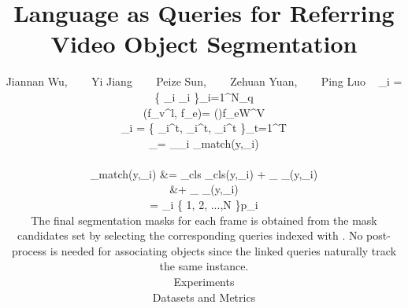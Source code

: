 \documentclass[10pt,twocolumn,letterpaper]{article}
\begin{document}
\title{Language as Queries for Referring Video Object Segmentation}

\author
{
Jiannan Wu, 
~~~
Yi Jiang
~~~
Peize Sun, 
~~~
Zehuan Yuan, 
~~~
Ping Luo
\
    \label{eq:dynamic_convolution}
    _{i} = \left \{ _{i} \circledast \omega_{i} \right \}_{i=1}^{N_{q}}

    \label{eq:interact}
    (f_{v}^{l}, f_{e})= ()f_{e}W^{V}

    \label{eq:hatyi}
    \vspace{-2mm}
    _{i} = \left \{ _{i}^{t}, _{i}^{t}, _{i}^{t} \right \}_{t=1}^{T}

    \label{eq:min}
    \vspace{-2mm}
    _{}= \mathop{\arg\min}_{_{i}\in {}} _{match}(y,_{i})
    \vspace{-2mm}

\label{eq:match}
\begin{aligned}
\vspace{-2mm}
    _{match}(y,_{i})  &=     
    \lambda_{cls}  _{cls}(y,\hat{y}_{i}) 
    + \lambda_{} _{\text{box}}(y,_{i}) \\
    &+ \lambda_{}  \mathcal{L}_{\text{mask}}(y,\hat{y}_{i}) 
    \vspace{-2mm}
\end{aligned}

    \label{eq:inference}
    \vspace{-2mm}
    \sigma = \mathop{\arg\max}_{i \in \left \{ 1, 2, ...,N \right \}}p_{i}
    \vspace{2mm}


The final segmentation masks for each frame  is obtained from the mask candidates set  by selecting the corresponding queries indexed with . No post-process is needed for associating objects since the linked queries naturally track the same instance. 
\section{Experiments}

\subsection{Datasets and Metrics}

}
\end{document}
